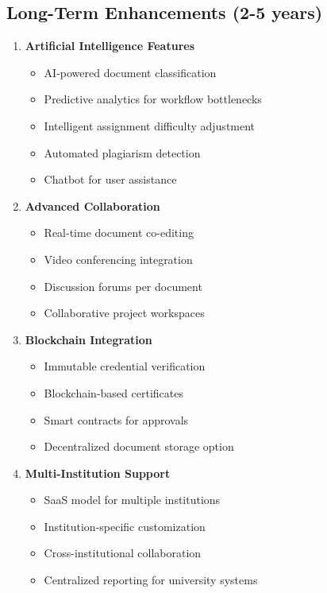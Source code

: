 \subsection{Long-Term Enhancements (2-5 years)}

\begin{enumerate}
\item \textbf{Artificial Intelligence Features}
\begin{itemize}
\item AI-powered document classification
\item Predictive analytics for workflow bottlenecks
\item Intelligent assignment difficulty adjustment
\item Automated plagiarism detection
\item Chatbot for user assistance
\end{itemize}

\item \textbf{Advanced Collaboration}
\begin{itemize}
\item Real-time document co-editing
\item Video conferencing integration
\item Discussion forums per document
\item Collaborative project workspaces
\end{itemize}

\item \textbf{Blockchain Integration}
\begin{itemize}
\item Immutable credential verification
\item Blockchain-based certificates
\item Smart contracts for approvals
\item Decentralized document storage option
\end{itemize}

\item \textbf{Multi-Institution Support}
\begin{itemize}
\item SaaS model for multiple institutions
\item Institution-specific customization
\item Cross-institutional collaboration
\item Centralized reporting for university systems
\end{itemize}


\end{enumerate}
